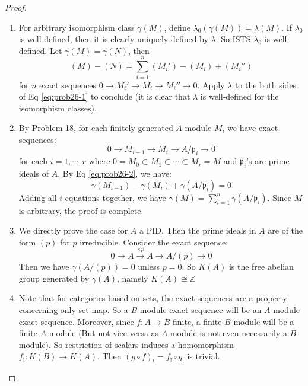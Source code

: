 \documentclass{solution}
\begin{document}
\begin{proof}
    \begin{enumerate}
        \item For arbitrary isomorphism class $\gamma(M)$, define $\lambda_0(\gamma(M)) = \lambda(M)$. If $\lambda_0$ is well-defined, then it is clearly uniquely defined by $\lambda$. So ISTS $\lambda_0$ is well-defined. Let $\gamma(M) = \gamma(N)$, then
        \begin{equation} \label{eq:prob26-1}
            (M) - (N) = \sum\limits_{i = 1}^{n} (M_i') - (M_i) + (M_i'')
        \end{equation}
        for $n$ exact sequences $0 \rightarrow M_i' \rightarrow M_i \rightarrow M_i'' \rightarrow 0$. Apply $\lambda$ to the both sides of Eq \ref{eq:prob26-1} to conclude (it is clear that $\lambda$ is well-defined for the isomorphism classes).
        \item By Problem 18, for each finitely generated $A$-module $M$, we have exact sequences:
        \begin{equation} \label{eq:prob26-2}
            0 \rightarrow M_{i - 1} \rightarrow M_{i} \rightarrow A / \mathfrak{p}_i \rightarrow 0
        \end{equation}
        for each $i = 1, \cdots, r$ where $0 = M_0 \subset M_1 \subset \cdots \subset M_r = M$ and $\mathfrak{p}_i$'s are prime ideals of $A$. By Eq \ref{eq:prob26-2}, we have:
        $$\gamma(M_{i - 1}) - \gamma(M_i) + \gamma(A / \mathfrak{p}_i) = 0$$
        Adding all $i$ equations together, we have $\gamma(M) = \sum\limits_{i = 1}^{n} \gamma(A / \mathfrak{p}_i)$. Since $M$ is arbitrary, the proof is complete.
        \item We directly prove the case for $A$ a PID. Then the prime ideals in $A$ are of the form $(p)$ for $p$ irreducible. Consider the exact sequence:
        $$0 \rightarrow A \xrightarrow{\times p} A \rightarrow A / (p) \rightarrow 0$$
        Then we have $\gamma(A / (p)) = 0$ unless $p = 0$. So $K(A)$ is the free abelian group generated by $\gamma(A)$, namely $K(A) \cong \mathbb{Z}$
        \item Note that for categories based on sets, the exact sequences are a property concerning only set map. So a $B$-module exact sequence will be an $A$-module exact sequence. Moreover, since $f: A \rightarrow B$ finite, a finite $B$-module will be a finite $A$ module ({\color{red}But not vice versa as $A$-module is not even necessarily a $B$-module}). So restriction of scalars induces a homomorphism $f_{!}: K(B) \rightarrow K(A)$. Then $(g \circ f)_{!} = f_{!} \circ g_{!}$ is trivial.
    \end{enumerate}
\end{proof}
\end{document}

